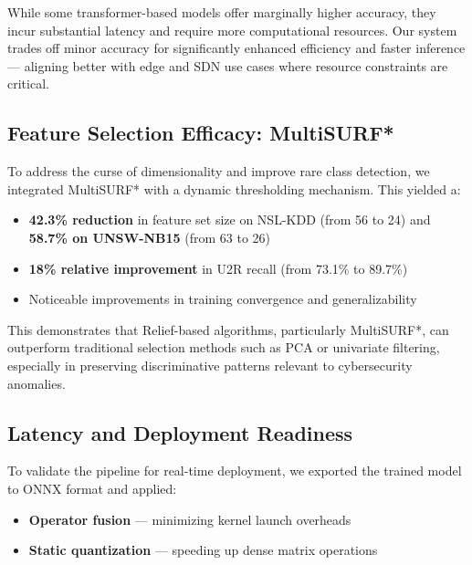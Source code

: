 \documentclass[conference]{IEEEtran}
\begin{document}
\begin{table}[htbp]
\caption{Comparative performance on NSL-KDD dataset}
\centering
{}
\label{tab:performance}
\end{table}

While some transformer-based models offer marginally higher accuracy, they incur substantial latency and require more computational resources. Our system trades off minor accuracy for significantly enhanced efficiency and faster inference — aligning better with edge and SDN use cases where resource constraints are critical.

\subsection{Feature Selection Efficacy: MultiSURF*}
To address the curse of dimensionality and improve rare class detection, we integrated MultiSURF* with a dynamic thresholding mechanism. This yielded a:
\begin{itemize}
    \item \textbf{42.3\% reduction} in feature set size on NSL-KDD (from 56 to 24) and \textbf{58.7\% on UNSW-NB15} (from 63 to 26)
    \item \textbf{18\% relative improvement} in U2R recall (from 73.1\% to 89.7\%)
    \item Noticeable improvements in training convergence and generalizability
\end{itemize}

This demonstrates that Relief-based algorithms, particularly MultiSURF*, can outperform traditional selection methods such as PCA or univariate filtering, especially in preserving discriminative patterns relevant to cybersecurity anomalies.

\subsection{Latency and Deployment Readiness}
To validate the pipeline for real-time deployment, we exported the trained model to ONNX format and applied:
\begin{itemize}
    \item \textbf{Operator fusion} — minimizing kernel launch overheads
    \item \textbf{Static quantization} — speeding up dense matrix operations
\end{itemize}
\end{document}
